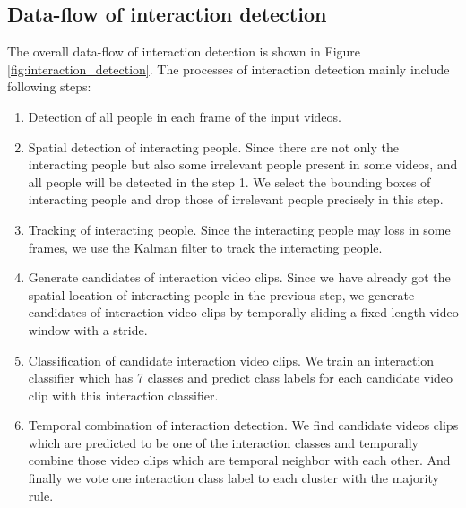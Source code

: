 \subsection{Data-flow of interaction detection}
The overall data-flow of interaction detection is shown in Figure \ref{fig:interaction_detection}. The processes of interaction detection mainly include following steps: 
\begin{enumerate}
	\item Detection of all people in each frame of the input videos.
	
	\item Spatial detection of interacting people. Since there are not only the interacting people but also some irrelevant people present in some videos, and all people will be detected in the step 1. We select the bounding boxes of interacting people and drop those of irrelevant people precisely in this step.
	
	\item Tracking of interacting people. Since the interacting people may loss in some frames, we use the Kalman filter to track the interacting people. 
	
	\item Generate candidates of interaction video clips. Since we have already got the spatial location of interacting people in the previous step, we generate candidates of interaction video clips by temporally sliding a fixed length video window with a stride.
	
	\item Classification of candidate interaction video clips. We train an interaction classifier which has 7 classes and predict class labels for each candidate video clip with this interaction classifier. 
	
	\item Temporal combination of interaction detection. We find candidate videos clips which are predicted to be one of the interaction classes and temporally combine those video clips which are temporal neighbor with each other. And finally we vote one interaction class label to each cluster with the majority rule.       
\end{enumerate} 

